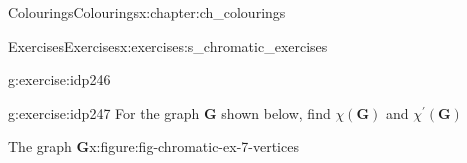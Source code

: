 \documentclass[oneside,10pt,]{book}
\numberwithin{equation}{section}
\newcommand{\bfG}{\mathbf{G}}
\begin{document}
\begin{chapterptx}{Colourings}{}{Colourings}{}{}{x:chapter:ch_colourings}
\begin{exercises-section}{Exercises}{}{Exercises}{}{}{x:exercises:s_chromatic_exercises}
\begin{divisionexercise}{3}{}{}{g:exercise:idp246}
\end{divisionexercise}%
\begin{divisionexercise}{4}{}{}{g:exercise:idp247}%
For the graph \(\bfG\) shown below, find \(\chi(\bfG)\) and \(\chi^\prime(\bfG)\) \begin{figureptx}{The graph \(\bfG\)}{x:figure:fig-chromatic-ex-7-vertices}{}%
\begin{image}{0.15}{0.7}{0.15}%
%
\end{image}%
\tcblower
\end{figureptx}%
%
\end{divisionexercise}%
\end{exercises-section}
\end{chapterptx}
\end{document}
